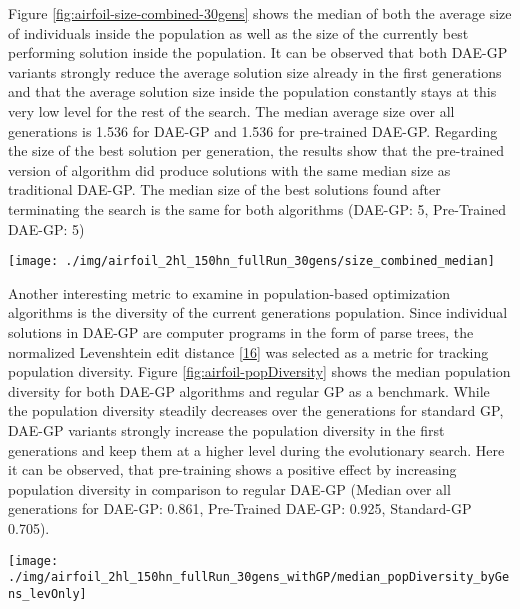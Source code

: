 \documentclass[
  11pt,
]{article}
\let\origfigure\figure
\let\endorigfigure\endfigure
\renewenvironment{figure}[1][2] {
    \expandafter\origfigure\expandafter[H]
} {
    \endorigfigure
}
\begin{document}
Figure \ref{fig:airfoil-size-combined-30gens} shows the median of both the average size of individuals inside the population as well as the size of the currently best performing solution inside the population.
It can be observed that both DAE-GP variants strongly reduce the average solution size already in the first generations and that the average solution size inside the population constantly stays at this very low level for the rest of the search.
The median average size over all generations is 1.536 for DAE-GP and 1.536 for pre-trained DAE-GP.
Regarding the size of the best solution per generation, the results show that the pre-trained version of algorithm did produce solutions with the same median size as traditional DAE-GP.
The median size of the best solutions found after terminating the search is the same for both algorithms (DAE-GP: 5, Pre-Trained DAE-GP: 5)

\begin{figure}[c]

{\centering \texttt{[image: ./img/airfoil\_2hl\_150hn\_fullRun\_30gens/size\_combined\_median]} 

}

\caption{Median Solution Size over 30 Generations - Airfoil}\label{fig:airfoil-size-combined-30gens}
\end{figure}

Another interesting metric to examine in population-based optimization algorithms is the diversity of the current generations population.
Since individual solutions in DAE-GP are computer programs in the form of parse trees, the normalized Levenshtein edit distance {[}\protect\hyperlink{ref-NormLevDistance}{16}{]} was selected as a metric for tracking population diversity.
Figure \ref{fig:airfoil-popDiversity} shows the median population diversity for both DAE-GP algorithms and regular GP as a benchmark.
While the population diversity steadily decreases over the generations for standard GP, DAE-GP variants strongly increase the population diversity in the first generations and keep them at a higher level during the evolutionary search.
Here it can be observed, that pre-training shows a positive effect by increasing population diversity in comparison to regular DAE-GP (Median over all generations for DAE-GP: 0.861, Pre-Trained DAE-GP: 0.925, Standard-GP 0.705).

\begin{figure}[c]

{\centering \texttt{[image: ./img/airfoil\_2hl\_150hn\_fullRun\_30gens\_withGP/median\_popDiversity\_byGens\_levOnly]} 

}

\caption{Median Population Diversity over 30 Generations - Airfoil}\label{fig:airfoil-popDiversity}
\end{figure}
\end{document}
